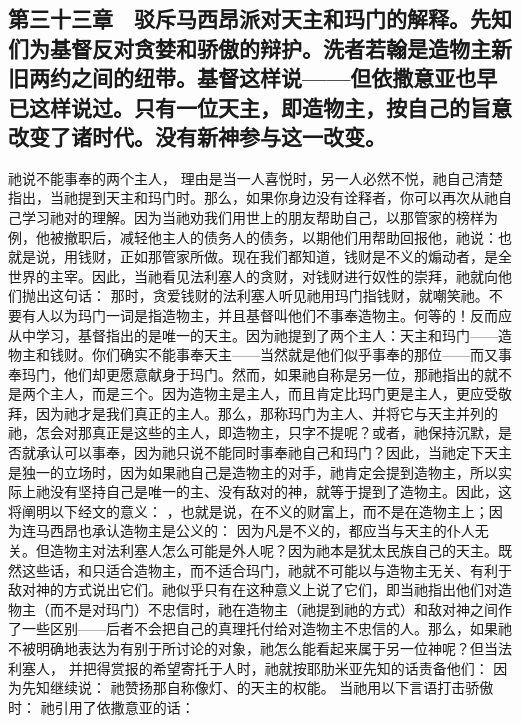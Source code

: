 
\subsection{第三十三章　驳斥马西昂派对天主和玛门的解释。先知们为基督反对贪婪和骄傲的辩护。洗者若翰是造物主新旧两约之间的纽带。基督这样说——但依撒意亚也早已这样说过。只有一位天主，即造物主，按自己的旨意改变了诸时代。没有新神参与这一改变。}

祂说不能事奉的两个主人， 理由是当一人喜悦时，另一人必然不悦，祂自己清楚指出，当祂提到天主和玛门时。那么，如果你身边没有诠释者，你可以再次从祂自己学习祂对的理解。因为当祂劝我们用世上的朋友帮助自己，以那管家的榜样为例，他被撤职后，减轻他主人的债务人的债务，以期他们用帮助回报他，祂说：也就是说，用钱财，正如那管家所做。现在我们都知道，钱财是不义的煽动者，是全世界的主宰。因此，当祂看见法利塞人的贪财，对钱财进行奴性的崇拜，祂就向他们抛出这句话：  那时，贪爱钱财的法利塞人听见祂用玛门指钱财，就嘲笑祂。不要有人以为玛门一词是指造物主，并且基督叫他们不事奉造物主。何等的！反而应从中学习，基督指出的是唯一的天主。因为祂提到了两个主人：天主和玛门——造物主和钱财。你们确实不能事奉天主——当然就是他们似乎事奉的那位——而又事奉玛门，他们却更愿意献身于玛门。然而，如果祂自称是另一位，那祂指出的就不是两个主人，而是三个。因为造物主是主人，而且肯定比玛门更是主人，更应受敬拜，因为祂才是我们真正的主人。那么，那称玛门为主人、并将它与天主并列的祂，怎会对那真正是这些的主人，即造物主，只字不提呢？或者，祂保持沉默，是否就承认可以事奉，因为祂只说不能同时事奉祂自己和玛门？因此，当祂定下天主是独一的立场时，因为如果祂自己是造物主的对手，祂肯定会提到造物主，所以实际上祂没有坚持自己是唯一的主、没有敌对的神，就等于提到了造物主。因此，这将阐明以下经文的意义：  ，也就是说，在不义的财富上，而不是在造物主上；因为连马西昂也承认造物主是公义的： 因为凡是不义的，都应当与天主的仆人无关。但造物主对法利塞人怎么可能是外人呢？因为祂本是犹太民族自己的天主。既然这些话，和只适合造物主，而不适合玛门，祂就不可能以与造物主无关、有利于敌对神的方式说出它们。祂似乎只有在这种意义上说了它们，即当祂指出他们对造物主（而不是对玛门）不忠信时，祂在造物主（祂提到祂的方式）和敌对神之间作了一些区别——后者不会把自己的真理托付给对造物主不忠信的人。那么，如果祂不被明确地表达为有别于所讨论的对象，祂怎么能看起来属于另一位神呢？但当法利塞人， 并把得赏报的希望寄托于人时，祂就按耶肋米亚先知的话责备他们：  因为先知继续说： 祂赞扬那自称像灯、的天主的权能。 当祂用以下言语打击骄傲时：  祂引用了依撒意亚的话： 